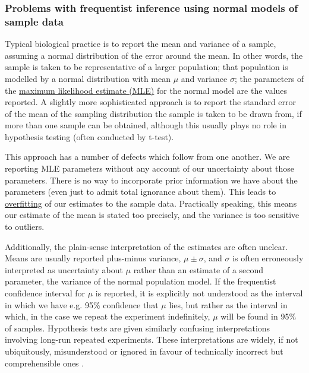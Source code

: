 \subsubsection{Problems with frequentist inference using normal models of sample data}
Typical biological practice is to report the mean and variance of a sample, assuming a normal distribution of the error around the mean. In other words, the sample is taken to be representative of a larger population; that population is modelled by a normal distribution with mean $\mu$ and variance $\sigma$; the parameters of the \hyperref[MLE]{maximum likelihood estimate (MLE)} for the normal model are the values reported. A slightly more sophisticated approach is to report the standard error of the mean of the sampling distribution the sample is taken to be drawn from, if more than one sample can be obtained, although this usually plays no role in hypothesis testing (often conducted by t-test).

This approach has a number of defects which follow from one another. We are reporting MLE parameters without any account of our uncertainty about those parameters. There is no way to incorporate prior information we have about the parameters (even just to admit total ignorance about them). This leads to \hyperref[ssec:overfit]{overfitting} of our estimates to the sample data. Practically speaking, this means our estimate of the mean is stated too precisely, and the variance is too sensitive to outliers.

Additionally, the plain-sense interpretation of the estimates are often unclear. Means are usually reported plus-minus variance, $\mu\pm\sigma$, and $\sigma$ is often erroneously interpreted as uncertainty about $\mu$ rather than an estimate of a second parameter, the variance of the normal population model. If the frequentist confidence interval for $\mu$ is reported, it is explicitly not understood as the interval in which we have e.g. 95$\%$ confidence that $\mu$ lies, but rather as the interval in which, in the case we repeat the experiment indefinitely, $\mu$ will be found in 95$\%$ of samples. Hypothesis tests are given similarly confusing interpretations involving long-run repeated experiments. These interpretations are widely, if not ubiquitously, misunderstood or ignored in favour of technically incorrect but comprehensible ones \cite{Hoekstra2014, Greenland2016}.


